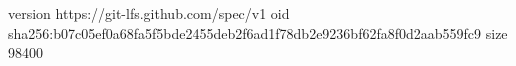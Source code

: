 version https://git-lfs.github.com/spec/v1
oid sha256:b07c05ef0a68fa5f5bde2455deb2f6ad1f78db2e9236bf62fa8f0d2aab559fc9
size 98400
